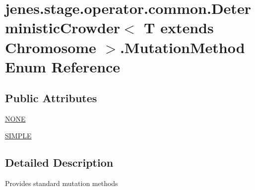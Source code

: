 \hypertarget{enumjenes_1_1stage_1_1operator_1_1common_1_1_deterministic_crowder_3_01_t_01extends_01_chromosome_01_4_1_1_mutation_method}{\section{jenes.\-stage.\-operator.\-common.\-Deterministic\-Crowder$<$ T extends Chromosome $>$.Mutation\-Method Enum Reference}
\label{enumjenes_1_1stage_1_1operator_1_1common_1_1_deterministic_crowder_3_01_t_01extends_01_chromosome_01_4_1_1_mutation_method}
}
\subsection*{Public Attributes}
\begin{DoxyCompactItemize}
\item 
\hyperlink{enumjenes_1_1stage_1_1operator_1_1common_1_1_deterministic_crowder_3_01_t_01extends_01_chromosome_01_4_1_1_mutation_method_a101f0e262d2ee3d09a30169160ca3bac}{N\-O\-N\-E}
\item 
\hyperlink{enumjenes_1_1stage_1_1operator_1_1common_1_1_deterministic_crowder_3_01_t_01extends_01_chromosome_01_4_1_1_mutation_method_ac71ccd0c89d8ce8bbaaaca2a39cc06bb}{S\-I\-M\-P\-L\-E}
\end{DoxyCompactItemize}


\subsection{Detailed Description}
Provides standard mutation methods 

